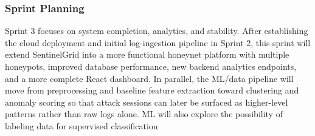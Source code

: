 \documentclass{article}
\begin{document}
\subsubsection{Sprint Planning}
Sprint 3 focuses on system completion, analytics, and stability. After establishing the cloud deployment and initial log-ingestion pipeline in Sprint 2, this sprint will extend SentinelGrid into a more functional honeynet platform with multiple honeypots, improved database performance, new backend analytics endpoints, and a more complete React dashboard. In parallel, the ML/data pipeline will move from preprocessing and baseline feature extraction toward clustering and anomaly scoring so that attack sessions can later be surfaced as higher-level patterns rather than raw logs alone. ML will also explore the possibility of labeling data for supervised classification 
\end{document}
